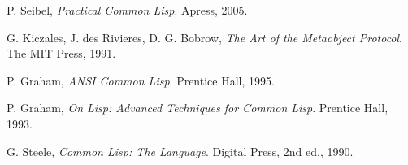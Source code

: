 \begin{thebibliography}{9}

  P. Seibel,
  \emph{Practical Common Lisp}.
  Apress,
  2005.

  G. Kiczales, J. des Rivieres, D. G. Bobrow,
  \emph{The Art of the Metaobject Protocol}.
  The MIT Press,
  1991.

  P. Graham,
  \emph{ANSI Common Lisp}.
  Prentice Hall,
  1995.

  P. Graham,
  \emph{On Lisp: Advanced Techniques for Common Lisp}.
  Prentice Hall,
  1993.

  G. Steele,
  \emph{Common Lisp: The Language}.
  Digital Press,
  2nd ed.,
  1990.

\end{thebibliography}
